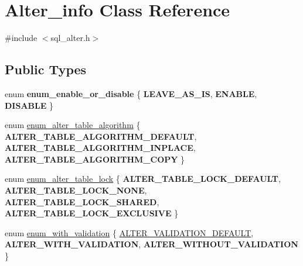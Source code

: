 \hypertarget{classAlter__info}{}\section{Alter\+\_\+info Class Reference}
\label{classAlter__info}


{\ttfamily \#include $<$sql\+\_\+alter.\+h$>$}

\subsection*{Public Types}
\begin{DoxyCompactItemize}
\item 
\mbox{\label{classAlter__info_a6703ae7d3b074ddcab98a55a13cef76c}} 
enum {\bfseries enum\+\_\+enable\+\_\+or\+\_\+disable} \{ {\bfseries L\+E\+A\+V\+E\+\_\+\+A\+S\+\_\+\+IS}, 
{\bfseries E\+N\+A\+B\+LE}, 
{\bfseries D\+I\+S\+A\+B\+LE}
 \}
\item 
enum \mbox{\hyperlink{classAlter__info_a01de1481ff05e3f4fc1efb2f63c2274c}{enum\+\_\+alter\+\_\+table\+\_\+algorithm}} \{ {\bfseries A\+L\+T\+E\+R\+\_\+\+T\+A\+B\+L\+E\+\_\+\+A\+L\+G\+O\+R\+I\+T\+H\+M\+\_\+\+D\+E\+F\+A\+U\+LT}, 
{\bfseries A\+L\+T\+E\+R\+\_\+\+T\+A\+B\+L\+E\+\_\+\+A\+L\+G\+O\+R\+I\+T\+H\+M\+\_\+\+I\+N\+P\+L\+A\+CE}, 
{\bfseries A\+L\+T\+E\+R\+\_\+\+T\+A\+B\+L\+E\+\_\+\+A\+L\+G\+O\+R\+I\+T\+H\+M\+\_\+\+C\+O\+PY}
 \}
\item 
enum \mbox{\hyperlink{classAlter__info_a10a92184da9b9d35060e9014fd4e0946}{enum\+\_\+alter\+\_\+table\+\_\+lock}} \{ {\bfseries A\+L\+T\+E\+R\+\_\+\+T\+A\+B\+L\+E\+\_\+\+L\+O\+C\+K\+\_\+\+D\+E\+F\+A\+U\+LT}, 
{\bfseries A\+L\+T\+E\+R\+\_\+\+T\+A\+B\+L\+E\+\_\+\+L\+O\+C\+K\+\_\+\+N\+O\+NE}, 
{\bfseries A\+L\+T\+E\+R\+\_\+\+T\+A\+B\+L\+E\+\_\+\+L\+O\+C\+K\+\_\+\+S\+H\+A\+R\+ED}, 
{\bfseries A\+L\+T\+E\+R\+\_\+\+T\+A\+B\+L\+E\+\_\+\+L\+O\+C\+K\+\_\+\+E\+X\+C\+L\+U\+S\+I\+VE}
 \}
\item 
enum \mbox{\hyperlink{classAlter__info_a4779e4302f27cfae682bf2e5a2e891a5}{enum\+\_\+with\+\_\+validation}} \{ \mbox{\hyperlink{classAlter__info_a4779e4302f27cfae682bf2e5a2e891a5a22b20f085e866c35f95a13f599ece203}{A\+L\+T\+E\+R\+\_\+\+V\+A\+L\+I\+D\+A\+T\+I\+O\+N\+\_\+\+D\+E\+F\+A\+U\+LT}}, 
{\bfseries A\+L\+T\+E\+R\+\_\+\+W\+I\+T\+H\+\_\+\+V\+A\+L\+I\+D\+A\+T\+I\+ON}, 
{\bfseries A\+L\+T\+E\+R\+\_\+\+W\+I\+T\+H\+O\+U\+T\+\_\+\+V\+A\+L\+I\+D\+A\+T\+I\+ON}
 \}
\end{DoxyCompactItemize}
